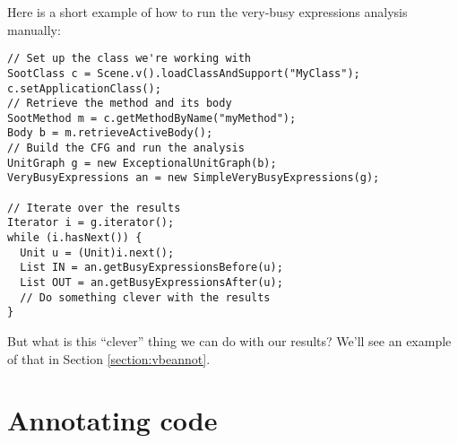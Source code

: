 \documentclass{article}
\begin{document}
Here is a short example of how to run the very-busy expressions
analysis manually:
\begin{center}
  \begin{minipage}{0.9 \linewidth}
    \begin{verbatim}
// Set up the class we're working with
SootClass c = Scene.v().loadClassAndSupport("MyClass");
c.setApplicationClass();
// Retrieve the method and its body
SootMethod m = c.getMethodByName("myMethod");
Body b = m.retrieveActiveBody();
// Build the CFG and run the analysis
UnitGraph g = new ExceptionalUnitGraph(b);
VeryBusyExpressions an = new SimpleVeryBusyExpressions(g);

// Iterate over the results
Iterator i = g.iterator();
while (i.hasNext()) {
  Unit u = (Unit)i.next();
  List IN = an.getBusyExpressionsBefore(u);
  List OUT = an.getBusyExpressionsAfter(u);
  // Do something clever with the results
}
    \end{verbatim}
  \end{minipage}
\end{center}
But what is this ``clever'' thing we can do with our results? We'll
see an example of that in Section \ref{section:vbeannot}.

\section{Annotating code}
\end{document}
